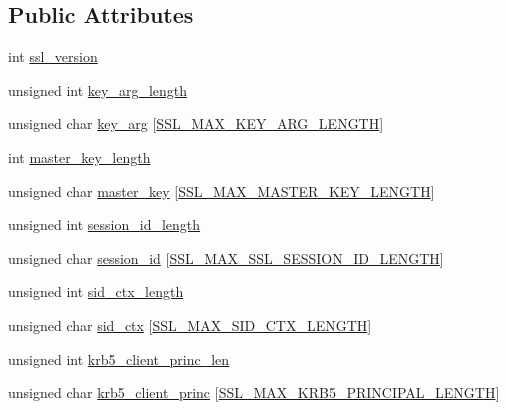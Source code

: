 \subsection*{Public Attributes}
\begin{DoxyCompactItemize}
\item 
int \hyperlink{structssl__session__st_a551e39a73ea78af29979d80d8a6db6f9}{ssl\-\_\-version}
\item 
unsigned int \hyperlink{structssl__session__st_aa59c33cbe59e8aa9fd097d2034665935}{key\-\_\-arg\-\_\-length}
\item 
unsigned char \hyperlink{structssl__session__st_a5f697ed1d136a066dcaa054a5aca54d5}{key\-\_\-arg} \mbox{[}\hyperlink{ssl_8h_abdf756f947260a71d7b7eebc332f6171}{S\-S\-L\-\_\-\-M\-A\-X\-\_\-\-K\-E\-Y\-\_\-\-A\-R\-G\-\_\-\-L\-E\-N\-G\-T\-H}\mbox{]}
\item 
int \hyperlink{structssl__session__st_a368c71211d55bcd3528a752c15e14e5d}{master\-\_\-key\-\_\-length}
\item 
unsigned char \hyperlink{structssl__session__st_ae0d5ecf4472dbff80b1ed36ce9c051c3}{master\-\_\-key} \mbox{[}\hyperlink{ssl_8h_ab96c69cdc3051de20ca9bb157d790f4a}{S\-S\-L\-\_\-\-M\-A\-X\-\_\-\-M\-A\-S\-T\-E\-R\-\_\-\-K\-E\-Y\-\_\-\-L\-E\-N\-G\-T\-H}\mbox{]}
\item 
unsigned int \hyperlink{structssl__session__st_a593371acd210b99ad600853361b807ce}{session\-\_\-id\-\_\-length}
\item 
unsigned char \hyperlink{structssl__session__st_a3e03d6073d29316d9eaecb78938ec92f}{session\-\_\-id} \mbox{[}\hyperlink{ssl_8h_a918194c29290f107e9440a722af9c2c6}{S\-S\-L\-\_\-\-M\-A\-X\-\_\-\-S\-S\-L\-\_\-\-S\-E\-S\-S\-I\-O\-N\-\_\-\-I\-D\-\_\-\-L\-E\-N\-G\-T\-H}\mbox{]}
\item 
unsigned int \hyperlink{structssl__session__st_a22ec3aac135c2b8268e0ea69c66fc829}{sid\-\_\-ctx\-\_\-length}
\item 
unsigned char \hyperlink{structssl__session__st_ad465f7554a5e14d6c92ee563d5ed6fe1}{sid\-\_\-ctx} \mbox{[}\hyperlink{ssl_8h_a5cef804495c6414283f4f29d4cea0dd0}{S\-S\-L\-\_\-\-M\-A\-X\-\_\-\-S\-I\-D\-\_\-\-C\-T\-X\-\_\-\-L\-E\-N\-G\-T\-H}\mbox{]}
\item 
unsigned int \hyperlink{structssl__session__st_ab87e9ec7a53c471d4f98d0479f48fc01}{krb5\-\_\-client\-\_\-princ\-\_\-len}
\item 
unsigned char \hyperlink{structssl__session__st_a0b4981b6ae2db5a19c054026c354c062}{krb5\-\_\-client\-\_\-princ} \mbox{[}\hyperlink{ssl_8h_a769b01678d30390799d7c78fb8c9859f}{S\-S\-L\-\_\-\-M\-A\-X\-\_\-\-K\-R\-B5\-\_\-\-P\-R\-I\-N\-C\-I\-P\-A\-L\-\_\-\-L\-E\-N\-G\-T\-H}\mbox{]}

\end{DoxyCompactItemize}
